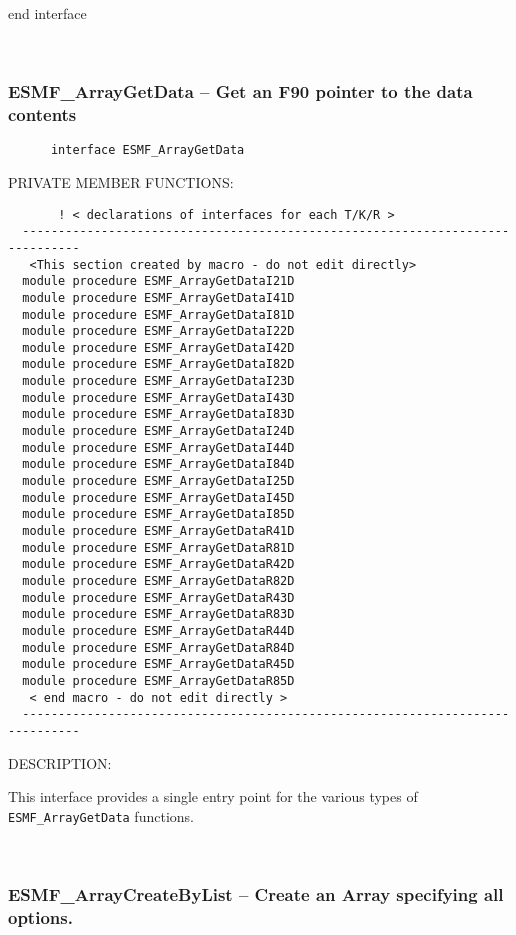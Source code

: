  end interface 
 
\mbox{}\hrulefill\ 
 
\subsubsection [ESMF\_ArrayGetData] {ESMF\_ArrayGetData -- Get an F90 pointer to the data contents}


\begin{verbatim}      interface ESMF_ArrayGetData\end{verbatim}{\sf PRIVATE MEMBER FUNCTIONS:}
\begin{verbatim}       ! < declarations of interfaces for each T/K/R >
  ------------------------------------------------------------------------------ 
   <This section created by macro - do not edit directly> 
  module procedure ESMF_ArrayGetDataI21D 
  module procedure ESMF_ArrayGetDataI41D 
  module procedure ESMF_ArrayGetDataI81D 
  module procedure ESMF_ArrayGetDataI22D 
  module procedure ESMF_ArrayGetDataI42D 
  module procedure ESMF_ArrayGetDataI82D 
  module procedure ESMF_ArrayGetDataI23D 
  module procedure ESMF_ArrayGetDataI43D 
  module procedure ESMF_ArrayGetDataI83D 
  module procedure ESMF_ArrayGetDataI24D 
  module procedure ESMF_ArrayGetDataI44D 
  module procedure ESMF_ArrayGetDataI84D 
  module procedure ESMF_ArrayGetDataI25D 
  module procedure ESMF_ArrayGetDataI45D 
  module procedure ESMF_ArrayGetDataI85D 
  module procedure ESMF_ArrayGetDataR41D 
  module procedure ESMF_ArrayGetDataR81D 
  module procedure ESMF_ArrayGetDataR42D 
  module procedure ESMF_ArrayGetDataR82D 
  module procedure ESMF_ArrayGetDataR43D 
  module procedure ESMF_ArrayGetDataR83D 
  module procedure ESMF_ArrayGetDataR44D 
  module procedure ESMF_ArrayGetDataR84D 
  module procedure ESMF_ArrayGetDataR45D 
  module procedure ESMF_ArrayGetDataR85D 
   < end macro - do not edit directly > 
  ------------------------------------------------------------------------------ 
 \end{verbatim}
{\sf DESCRIPTION:\\ }


   This interface provides a single entry point for the various
   types of {\tt ESMF\_ArrayGetData} functions.
   
 
\mbox{}\hrulefill\ 
 
\subsubsection [ESMF\_ArrayCreateByList] {ESMF\_ArrayCreateByList -- Create an Array specifying all options.}


